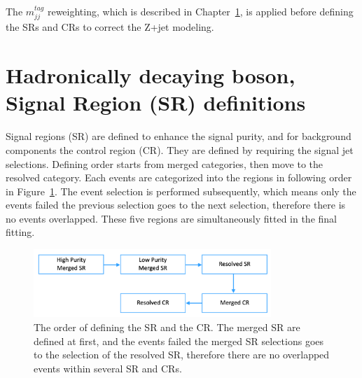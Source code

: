 The $m^{tag}_{jj}$ reweighting, which is described in Chapter~\ref{}, is applied before defining the SRs and CRs to correct the Z+jet modeling.

\section{Hadronically decaying boson, Signal Region (SR) definitions}
Signal regions (SR) are defined to enhance the signal purity, and for background  components the control region (CR). They are defined by requiring the signal jet selections. Defining order starts from merged categories, then move to the resolved category. Each events are categorized into the regions in following order in Figure~\ref{fig:order}. The event selection is performed subsequently, which means only the events failed the previous selection goes to the next selection, therefore there is no events overlapped.
These five regions are simultaneously fitted in the final fitting.

\begin{figure}[H]
    \centering
    \includegraphics[width=0.8\textwidth]{figures/order}
    \caption{The order of defining the SR and the CR. The merged SR are defined at first, and the events failed the merged SR selections goes to the selection of the resolved SR, therefore there are no overlapped events within several SR and CRs.}
    \label{fig:order}
\end{figure}

